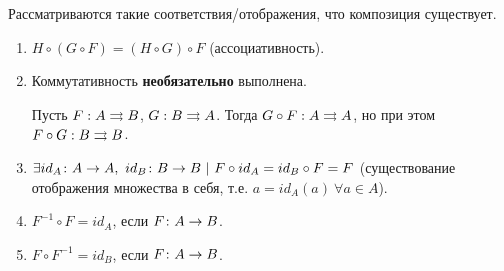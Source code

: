 Рассматриваются такие соответствия/отображения, что композиция существует.
\begin{enumerate}
	\item $H \circ (G \circ F) = (H \circ G) \circ F$ (ассоциативность).
	\item Коммутативность \textbf{необязательно} выполнена.
	\begin{example}
		Пусть $F : A \rightrightarrows B$, $G : B \rightrightarrows A$. Тогда $G \circ F : A \rightrightarrows A$, но при этом $F \circ G : B \rightrightarrows B$.
	\end{example}
	\item $\exists id_A \colon A \rightarrow A,\ id_B \colon B \rightarrow B\ |\ F \circ id_A = id_B \circ F = F$ (существование отображения множества в себя, т.е. $a = id_A(a)\ \forall a \in A$).
	\item $F^{-1} \circ F = id_A$, если $F \colon A \rightarrow B$.
	\item $F \circ F^{-1} = id_B$, если $F \colon A \rightarrow B$.
\end{enumerate}